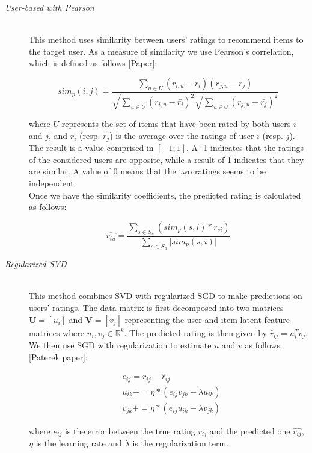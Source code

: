 \documentclass[10pt,conference,compsocconf]{IEEEtran}
\begin{document}
\begin{description}

\item[\emph{User-based with Pearson}]\ \\
This method uses similarity between users' ratings to recommend items to the target user. As a measure of similarity we use Pearson's correlation, which is defined as follows [Paper]:

$$
sim_p(i, j) = \frac{\sum_{u \in U} (r_{i,u} - \bar{r_i})(r_{j,u} - \bar{r_j})}{\sqrt{\sum_{u \in U} (r_{i,u} - \bar{r_i})^2}	\sqrt{\sum_{u \in U} (r_{j,u} - \bar{r_j})^2}}
$$

where $U$ represents the set of items that have been rated by both users $i$ and $j$, and $\bar{r_i}$ (resp. $\bar{r_j}$) is the average over the ratings of user $i$ (resp. $j$). The result is a value comprised in $[-1;1]$. A -1 indicates that the ratings of the considered users are opposite, while a result of 1 indicates that they are similar. A value of 0 means that the two ratings seems to be independent. \\
Once we have the similarity coefficients, the predicted rating is calculated as follows:

$$
\hat{r_{iu}} = \frac{\sum_{s \in S_u} (sim_p(s, i) \ast r_{si} )}{\sum_{s \in S_u} \vert sim_p(s, i) \vert}
$$ 

\item[\emph{Regularized SVD}]\ \\
This method combines SVD with regularized SGD to make predictions on users' ratings. The data matrix is first decomposed into two matrices $\textbf{U} = \left[ u_i \right]$ and $\textbf{V} = \left[ v_j \right]$ representing the user and item latent feature matrices where $u_i,v_j \in \mathbb{R}^k$. The predicted rating is then given by $\hat{r}_{ij} = u_i^Tv_j$. We then use SGD with regularization to estimate $u$ and $v$ as follows [Paterek paper]:

$$
\begin{aligned}
& e_{ij} = r_{ij} - \hat{r}_{ij} \\
& u_{ik} += \eta \ast (e_{ij}v_{jk} - \lambda u_{ik}) \\
& v_{jk} += \eta \ast (e_{ij}u_{ik} - \lambda v_{jk})
\end{aligned}
$$

\noindent where $e_{ij}$ is the error between the true rating $r_{ij}$ and the predicted one $\hat{r_{ij}}$, $\eta$ is the learning rate and $\lambda$ is the regularization term.



\end{description}
\end{document}

